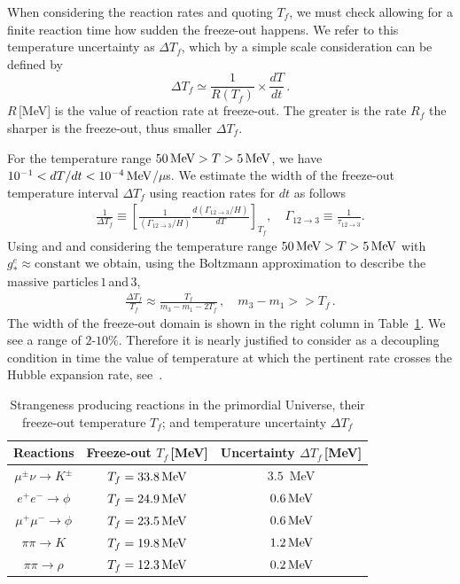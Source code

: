 When considering the reaction rates and quoting $T_f$, we must check allowing for a finite reaction time how sudden the freeze-out happens. We refer to this temperature uncertainty as $\Delta T_f$, which by a simple scale consideration can be defined by
\begin{equation}\label{eq:DeltaT}
\Delta T_f\simeq \frac{1}{R(T_f)}\times \frac{dT}{dt}\,. 
\end{equation}
$R$\,[MeV] is the value of reaction rate at freeze-out. The greater is the rate $R_f$ the sharper is the freeze-out, thus smaller $\Delta T_f$.

For the temperature range $50\text{\,MeV}>T>5\text{\,MeV}$, we have $10^{-1}<dT/dt<10^{-4}\text{\,MeV}$/$\mu$s. We estimate the width of the freeze-out temperature interval $\Delta T_f$ using reaction rates for $dt$ as follows
\begin{align}
\frac{1}{\Delta T_f}\equiv \left[\frac{1}{(\Gamma_{12\to3}/H)}\frac{d(\Gamma_{12\to3}/H)}{dT}\right]_{T_f},\quad \Gamma_{12\to3}\equiv\frac{1}{\tau_{12\to3}}.
\end{align}
Using  and  and considering the temperature range $50\text{\,MeV}>T>5\text{\,MeV}$ with $g^e_\ast\approx\mathrm{constant}$ we obtain, using the Boltzmann approximation to describe the massive particles\,$1$\,and\,$3$,
\begin{align}\label{DeltaFreezeout}
 \frac{\Delta T_f}{ T_f} \approx\frac{T_f }{ m_3 - m_1 -2T_f}\,,\quad m_3 - m_1>> T_f\,.
\end{align}
The width of the freeze-out domain is shown in the right column in Table~\ref{FreezeoutTemperature_table}. We see a range of $2$-$10\%$. Therefore it is nearly justified to consider as a decoupling condition in time the value of temperature at which the pertinent rate crosses the Hubble expansion rate, see~.
 
\begin{table} 
\centering
\begin{tabular}{c| c| c}
\hline\hline
Reactions &Freeze-out $T_f$\,[MeV] & {Uncertainty $\Delta T_f$\,[MeV]} \\
\hline
$\mu^\pm\nu\rightarrow K^\pm$ & $T_f=33.8\text{\,MeV}$ & {$3.5$ \,MeV}\\ 
\hline
$e^+e^-\rightarrow \phi$ & $T_f=24.9\text{\,MeV}$ &{$0.6\text{\,MeV}$}\\
$\mu^+\mu^-\rightarrow\phi$ & $T_f=23.5\text{\,MeV}$ &{$0.6\text{\,MeV}$}\\
\hline
 $\pi\pi\rightarrow K$ & $T_f=19.8\text{\,MeV}$&{$1.2\text{\,MeV}$}\\
\hline
$\pi\pi\rightarrow\rho$ & $T_f=12.3\text{\,MeV}$&{$0.2\text{\,MeV}$}\\
\hline\hline
\end{tabular}
\caption{Strangeness producing reactions in the primordial Universe, their freeze-out temperature $T_f$; and temperature uncertainty $\Delta T_f$}
\label{FreezeoutTemperature_table} 
\end{table}

